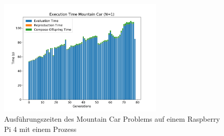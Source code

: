 \begin{figure}[!h]
	\centering
	\includegraphics[width=0.7\textwidth]{./img/mountain_car_single/1413_time_1core_1pi.pdf} 
	\caption{Ausführungszeiten des Mountain Car Problems auf einem Raspberry Pi 4 mit einem Prozess}
	\label{fig:mountain_car_time_single_core}
\end{figure}%

